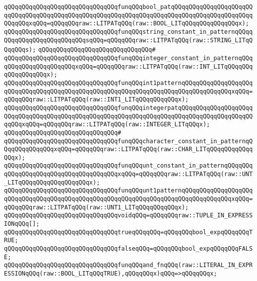 \verb|qQQqqQQqqQQqqQQqqQQqqQQqqQQqqQQqfunqQQqbool_patqQQqqQQqqQQqqQQqqQQqqQQqqQQqqQQqqQQqqQQqqQQqqQQqqQQqqQQqqQQqqQQqqQQqqQQqqQQqqQQqqQQqqQQqqQQqqQQqqQQqxqQQq=qQQqqQQqraw::LITPATqQQq(raw::BOOL_LITqQQqqQQqqQQqqQQqx);|\newline
\verb|qQQqqQQqqQQqqQQqqQQqqQQqqQQqqQQqfunqQQqstring_constant_in_patternqQQqqQQqqQQqqQQqqQQqqQQqqQQqsqQQq=qQQqqQQqraw::LITPATqQQq(raw::STRING_LITqQQqqQQqs);|\newline
\verb|qQQqqQQqqQQqqQQqqQQqqQQqqQQqqQQq#|\newline
\verb|qQQqqQQqqQQqqQQqqQQqqQQqqQQqqQQqfunqQQqinteger_constant_in_patternqQQqqQQqqQQqqQQqqQQqqQQqxqQQq=qQQqqQQqraw::LITPATqQQq(raw::INT_LITqQQqqQQqqQQqqQQqqQQqx);|\newline
\verb|qQQqqQQqqQQqqQQqqQQqqQQqqQQqqQQqfunqQQqint1patternqQQqqQQqqQQqqQQqqQQqqQQqqQQqqQQqqQQqqQQqqQQqqQQqqQQqqQQqqQQqqQQqqQQqqQQqqQQqqQQqqQQqxqQQq=qQQqqQQqraw::LITPATqQQq(raw::INT1_LITqQQqqQQqqQQqx);|\newline
\verb|qQQqqQQqqQQqqQQqqQQqqQQqqQQqqQQqfunqQQqintegerpatqQQqqQQqqQQqqQQqqQQqqQQqqQQqqQQqqQQqqQQqqQQqqQQqqQQqqQQqqQQqqQQqqQQqqQQqqQQqqQQqqQQqqQQqqQQqqQQqxqQQq=qQQqqQQqraw::LITPATqQQq(raw::INTEGER_LITqQQqx);|\newline
\verb|qQQqqQQqqQQqqQQqqQQqqQQqqQQqqQQq#|\newline
\verb|qQQqqQQqqQQqqQQqqQQqqQQqqQQqqQQqfunqQQqcharacter_constant_in_patternqQQqqQQqqQQqqQQqxqQQq=qQQqqQQqraw::LITPATqQQq(raw::CHAR_LITqQQqqQQqqQQqqQQqx);|\newline
\verb|qQQqqQQqqQQqqQQqqQQqqQQqqQQqqQQqfunqQQqunt_constant_in_patternqQQqqQQqqQQqqQQqqQQqqQQqqQQqqQQqqQQqqQQqxqQQq=qQQqqQQqraw::LITPATqQQq(raw::UNT_LITqQQqqQQqqQQqqQQqqQQqx);|\newline
\verb|qQQqqQQqqQQqqQQqqQQqqQQqqQQqqQQqfunqQQqunt1patternqQQqqQQqqQQqqQQqqQQqqQQqqQQqqQQqqQQqqQQqqQQqqQQqqQQqqQQqqQQqqQQqqQQqqQQqqQQqqQQqqQQqxqQQq=qQQqqQQqraw::LITPATqQQq(raw::UNT1_LITqQQqqQQqqQQqx);|\newline
\newline
\verb|qQQqqQQqqQQqqQQqqQQqqQQqqQQqqQQqvoidqQQq=qQQqqQQqraw::TUPLE_IN_EXPRESSIONqQQq[];|\newline
\newline
\verb|qQQqqQQqqQQqqQQqqQQqqQQqqQQqqQQqtrueqQQqqQQq=qQQqqQQqbool_expqQQqqQQqTRUE;|\newline
\verb|qQQqqQQqqQQqqQQqqQQqqQQqqQQqqQQqfalseqQQq=qQQqqQQqbool_expqQQqqQQqFALSE;|\newline
\newline
\verb|qQQqqQQqqQQqqQQqqQQqqQQqqQQqqQQqfunqQQqand_fnqQQq(raw::LITERAL_IN_EXPRESSIONqQQq(raw::BOOL_LITqQQqTRUE),qQQqqQQqx)qQQq=>qQQqqQQqx;|\newline
